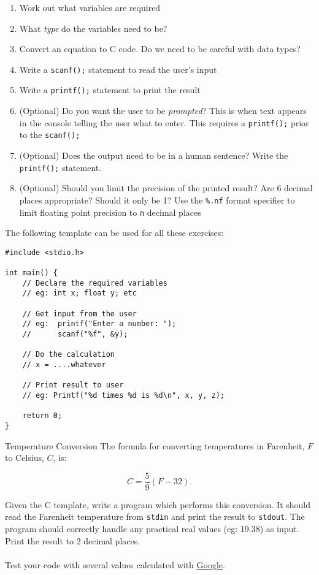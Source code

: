 \documentclass{lab}
\begin{document}
\begin{enumerate}
\item Work out what variables are required
\item What \textit{type} do the variables need to be?
\item Convert an equation to C code. Do we need to be careful with data types?
\item Write a \texttt{scanf();} statement to read the user's input
\item Write a \texttt{printf();} statement to print the result
\item (Optional) Do you want the user to be \textit{prompted}? This is when text appears in the console telling the user what to enter. This requires a \texttt{printf();} prior to the \texttt{scanf();}
\item (Optional) Does the output need to be in a human sentence? Write the \texttt{printf();} statement.
\item (Optional) Should you limit the precision of the printed result? Are 6 decimal places appropriate? Should it only be 1? Use the \texttt{\%.nf} format specifier to limit floating point precision to \texttt{n} decimal places
\end{enumerate}

The following template can be used for all these exercises:

\begin{lstlisting}[style=CStyle]
#include <stdio.h>

int main() {
	// Declare the required variables 
	// eg: int x; float y; etc	
	
	// Get input from the user
	// eg: 	printf("Enter a number: ");
	// 		scanf("%f", &y);	
	
	// Do the calculation
	// x = ....whatever
	
	// Print result to user
	// eg: Printf("%d times %d is %d\n", x, y, z);
		
	return 0;
}
\end{lstlisting}

\pagebreak
\begin{task}{Temperature Conversion}{}
The formula for converting temperatures in Farenheit, $F$ to Celsius, $C$, is:

\begin{equation}\label{eq:temp}
C = \frac{5}{9}(F - 32).
\end{equation}

Given the C template, write a program which performs this conversion. It should read the Farenheit temperature from \texttt{stdin} and print the result to \texttt{stdout}. The program should correctly handle any practical real values (eg: 19.38) as input. Print the result to 2 decimal places.
\\ \\
Test your code with several values calculated with \underline{\href{https://www.google.com.au/search?q=farenheit+to+celsius}{Google}}.
\end{task}
\end{document}
